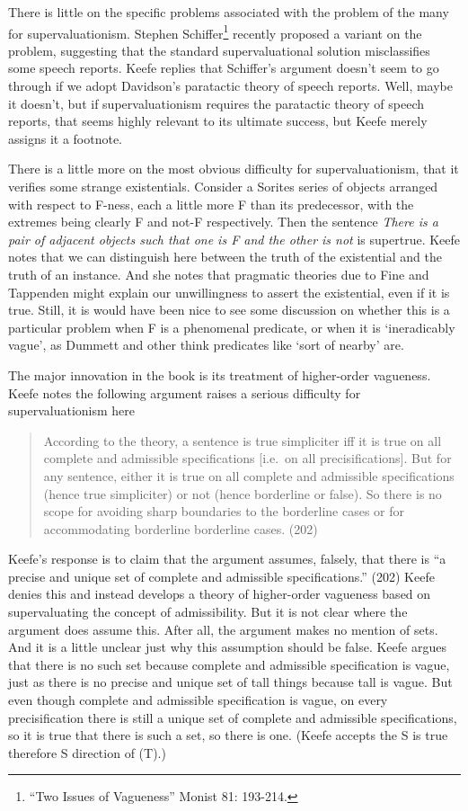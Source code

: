 \documentclass[
  10pt,
  letterpaper,
  DIV=11,
  numbers=noendperiod,
  twoside]{scrartcl}
\begin{document}
There is little on the specific problems associated with the problem of
the many for supervaluationism. Stephen Schiffer\footnote{``Two Issues
  of Vagueness'' Monist 81: 193-214.} recently proposed a variant on the
problem, suggesting that the standard supervaluational solution
misclassifies some speech reports. Keefe replies that Schiffer's
argument doesn't seem to go through if we adopt Davidson's paratactic
theory of speech reports. Well, maybe it doesn't, but if
supervaluationism requires the paratactic theory of speech reports, that
seems highly relevant to its ultimate success, but Keefe merely assigns
it a footnote.

There is a little more on the most obvious difficulty for
supervaluationism, that it verifies some strange existentials. Consider
a Sorites series of objects arranged with respect to F-ness, each a
little more F than its predecessor, with the extremes being clearly F
and not-F respectively. Then the sentence \emph{There is a pair of
adjacent objects such that one is F and the other is not} is supertrue.
Keefe notes that we can distinguish here between the truth of the
existential and the truth of an instance. And she notes that pragmatic
theories due to Fine and Tappenden might explain our unwillingness to
assert the existential, even if it is true. Still, it is would have been
nice to see some discussion on whether this is a particular problem when
F is a phenomenal predicate, or when it is `ineradicably vague', as
Dummett and other think predicates like `sort of nearby' are.

The major innovation in the book is its treatment of higher-order
vagueness. Keefe notes the following argument raises a serious
difficulty for supervaluationism here

\begin{quote}
According to the theory, a sentence is true simpliciter iff it is true
on all complete and admissible specifications {[}i.e.~on all
precisifications{]}. But for any sentence, either it is true on all
complete and admissible specifications (hence true simpliciter) or not
(hence borderline or false). So there is no scope for avoiding sharp
boundaries to the borderline cases or for accommodating borderline
borderline cases. (202)
\end{quote}

Keefe's response is to claim that the argument assumes, falsely, that
there is ``a precise and unique set of complete and admissible
specifications.'' (202) Keefe denies this and instead develops a theory
of higher-order vagueness based on supervaluating the concept of
admissibility. But it is not clear where the argument does assume this.
After all, the argument makes no mention of sets. And it is a little
unclear just why this assumption should be false. Keefe argues that
there is no such set because complete and admissible specification is
vague, just as there is no precise and unique set of tall things because
tall is vague. But even though complete and admissible specification is
vague, on every precisification there is still a unique set of complete
and admissible specifications, so it is true that there is such a set,
so there is one. (Keefe accepts the S is true therefore S direction of
(T).)
\end{document}
